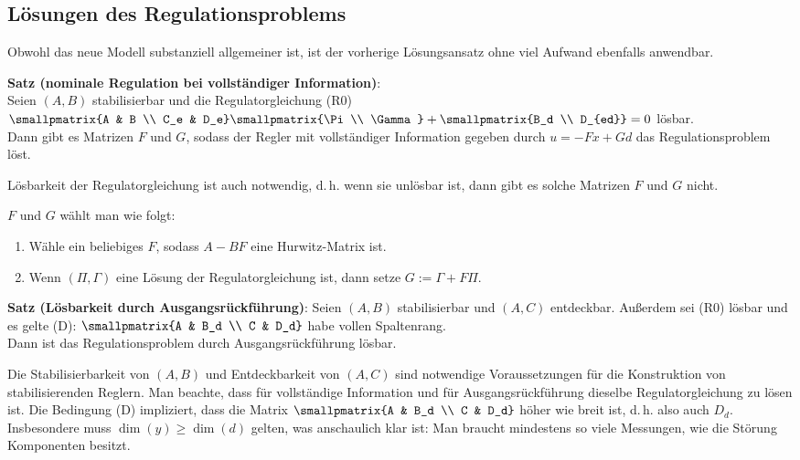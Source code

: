 \pagebreak

\subsection{%
    Lösungen des Regulationsproblems%
}

Obwohl das neue Modell substanziell allgemeiner ist, ist der vorherige Lösungsansatz ohne viel
Aufwand ebenfalls anwendbar.

\textbf{Satz (nominale Regulation bei vollständiger Information)}:\\
Seien $(A, B)$ stabilisierbar und die Regulatorgleichung (R0)
$\smallpmatrix{A & B \\ C_e & D_e} \smallpmatrix{\Pi \\ \Gamma} +
\smallpmatrix{B_d \\ D_{ed}} = 0$
lösbar.\\
Dann gibt es Matrizen $F$ und $G$, sodass der Regler mit vollständiger
Information gegeben durch $u = -Fx + Gd$ das Regulationsproblem löst.

Lösbarkeit der Regulatorgleichung ist auch notwendig, d.\,h. wenn sie unlösbar ist,
dann gibt es solche Matrizen $F$ und $G$ nicht.

$F$ und $G$ wählt man wie folgt:
\begin{enumerate}
    \item
    Wähle ein beliebiges $F$, sodass $A - BF$ eine Hurwitz-Matrix ist.

    \item
    Wenn $(\Pi, \Gamma)$ eine Lösung der Regulatorgleichung ist,
    dann setze $G := \Gamma + F\Pi$.
\end{enumerate}

\linie

\textbf{Satz (Lösbarkeit durch Ausgangsrückführung)}:
Seien $(A, B)$ stabilisierbar und $(A, C)$ entdeckbar.
Außerdem sei (R0) lösbar und es gelte (D): $\smallpmatrix{A & B_d \\ C & D_d}$ habe vollen
Spaltenrang.\\
Dann ist das Regulationsproblem durch Ausgangsrückführung lösbar.

Die Stabilisierbarkeit von $(A, B)$ und Entdeckbarkeit von $(A, C)$ sind notwendige Voraussetzungen
für die Konstruktion von stabilisierenden Reglern.
Man beachte, dass für vollständige Information und für Ausgangsrückführung dieselbe
Regulatorgleichung zu lösen ist.
Die Bedingung (D) impliziert, dass die Matrix $\smallpmatrix{A & B_d \\ C & D_d}$ höher wie
breit ist, d.\,h. also auch $D_d$.
Insbesondere muss $\dim(y) \ge \dim(d)$ gelten, was anschaulich klar ist:
Man braucht mindestens so viele Messungen, wie die Störung Komponenten besitzt.

